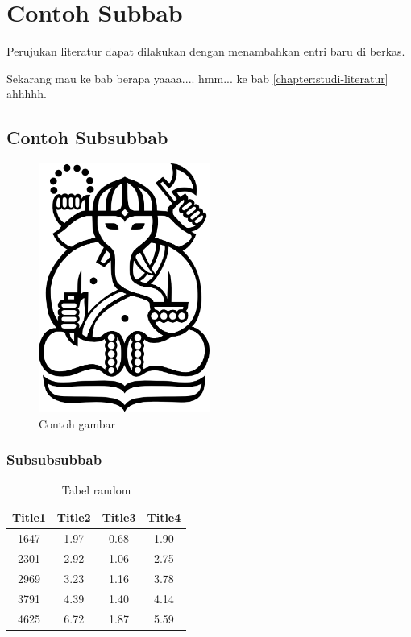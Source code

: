 \section{Contoh Subbab}
Perujukan literatur dapat dilakukan dengan menambahkan entri baru di berkas.

Sekarang mau ke bab berapa yaaaa.... hmm... ke bab \ref{chapter:studi-literatur} ahhhhh.

\blindtext

\subsection{Contoh Subsubbab}
\label{subsec:contoh-subsec}

\blindtext

\begin{figure}[ht]
	\centering
	\includegraphics[width=0.5\textwidth]{resources/cover-ganesha.jpg}
	\caption{Contoh gambar}
\end{figure}

\subsubsection{Subsubsubbab}
\blindtext

\blindtext

\begin{table}[h]
	\caption{Tabel random}
	\vspace{0.25cm}
	\begin{center}
		\begin{tabular}{|c|c|c|c|}
			\hline
			Title1 & Title2 & Title3 & Title4  \tabularnewline
			\hline
			1647   & 1.97   & 0.68   & 1.90 \tabularnewline
			2301   & 2.92   & 1.06   & 2.75 \tabularnewline
			2969   & 3.23   & 1.16   & 3.78 \tabularnewline
			3791   & 4.39   & 1.40   & 4.14 \tabularnewline
			4625   & 6.72   & 1.87   & 5.59 \tabularnewline
			\hline
		\end{tabular}
	\end{center}
\end{table}